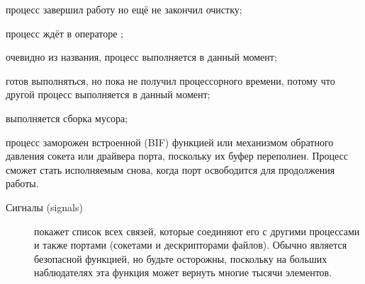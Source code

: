 \begin{description*}
\begin{description}
		\begin{description*}
			\item[\expression{exiting}] процесс завершил работу но ещё не закончил очистку;
			\item[\expression{waiting}] процесс ждёт в операторе \expression{receive ... end};
			\item[\expression{running}] очевидно из названия, процесс выполняется в данный момент;
			\item[\expression{runnable}] готов выполняться, но пока не получил процессорного времени, потому что другой процесс выполняется в данный момент;
			\item[\expression{garbage\_collecting}] выполняется сборка мусора;
			\item[\expression{suspended}] процесс заморожен встроенной (BIF) функцией или механизмом обратного давления сокета или драйвера порта, поскольку их буфер переполнен. Процесс сможет стать исполняемым снова, когда порт освободится для продолжения работы.
		\end{description*}
	\end{description}

	\item[Сигналы (signals)] \hfill
	\begin{description}
		\item[] покажет список всех связей, которые соединяют его с другими процессами и также портами (сокетами и дескрипторами файлов). Обычно является безопасной функцией, но будьте осторожны, поскольку на больших наблюдателях эта функция может вернуть многие тысячи элементов.
		

\end{description}
\end{description*}
